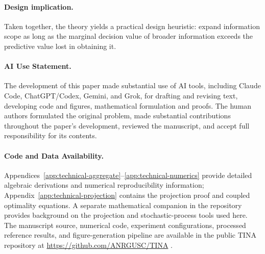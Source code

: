 \documentclass[11pt]{article}
\begin{document}
\paragraph{Design implication.}
Taken together, the theory yields a practical design heuristic: expand
information scope as long as the marginal decision value of broader information
exceeds the predictive value lost in obtaining it.

\paragraph{AI Use Statement.}
The development of this paper made substantial use of AI tools, including
Claude Code, ChatGPT/Codex, Gemini, and Grok, for drafting and revising text,
developing code and figures, mathematical formulation and proofs.
The human authors formulated the original problem, made substantial
contributions throughout the paper's development, reviewed the manuscript, and
accept full responsibility for its contents.

\paragraph{Code and Data Availability.}
Appendices~\ref{app:technical-aggregate}--\ref{app:technical-numerics} provide detailed algebraic
derivations and numerical reproducibility information;
Appendix~\ref{app:technical-projection} contains the projection proof and
coupled optimality equations. A separate mathematical
companion in the repository provides background on the projection and
stochastic-process tools used here.
The manuscript source, numerical code, experiment configurations, processed
reference results, and figure-generation pipeline are available in the public
TINA repository at \url{https://github.com/ANRGUSC/TINA}
\cite{tina2026software}.




\clearpage
\appendix
{}

\end{document}
